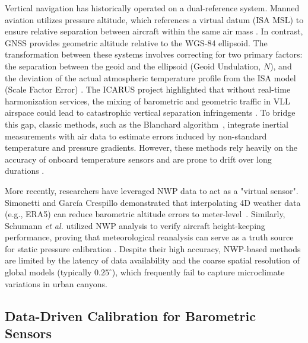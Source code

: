 Vertical navigation has historically operated on a dual-reference system. Manned aviation utilizes pressure altitude, which references a virtual datum (ISA MSL) to ensure relative separation between aircraft within the same air mass \cite{SIDs_2022}. In contrast, GNSS provides geometric altitude relative to the WGS-84 ellipsoid. The transformation between these systems involves correcting for two primary factors: the separation between the geoid and the ellipsoid (Geoid Undulation, $N$), and the deviation of the actual atmospheric temperature profile from the ISA model (Scale Factor Error) \cite{navi_637}.  The ICARUS project highlighted that without real-time harmonization services, the mixing of barometric and geometric traffic in VLL airspace could lead to catastrophic vertical separation infringements \cite{SIDs_2022}. To bridge this gap, classic methods, such as the Blanchard algorithm~\cite{blanchard1971new}, integrate inertial measurements with air data to estimate errors induced by non-standard temperature and pressure gradients. However, these methods rely heavily on the accuracy of onboard temperature sensors and are prone to drift over long durations \cite{li2010errors}. 

More recently, researchers have leveraged NWP data to act as a "virtual sensor". Simonetti and Garc\'{i}a Crespillo demonstrated that interpolating 4D weather data (e.g., ERA5) can reduce barometric altitude errors to meter-level~\cite{navi_637}. Similarly, Schumann \textit{et al.} utilized NWP analysis to verify aircraft height-keeping performance, proving that meteorological reanalysis can serve as a truth source for static pressure calibration \cite{Schumann_2017}. Despite their high accuracy, NWP-based methods are limited by the latency of data availability and the coarse spatial resolution of global models (typically $0.25^\circ$), which frequently fail to capture microclimate variations in urban canyons.

\subsection{Data-Driven Calibration for Barometric Sensors}

